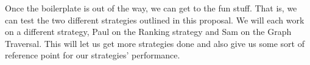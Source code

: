 \documentclass{article}
\begin{document}
\par Once the boilerplate is out of the way, we can get to the fun stuff. That is, we can test the two different strategies outlined in this proposal. We will each work on a different strategy, Paul on the Ranking strategy and Sam on the Graph Traversal. This will let us get more strategies done and also give us some sort of reference point for our strategies' performance.
\end{document}
